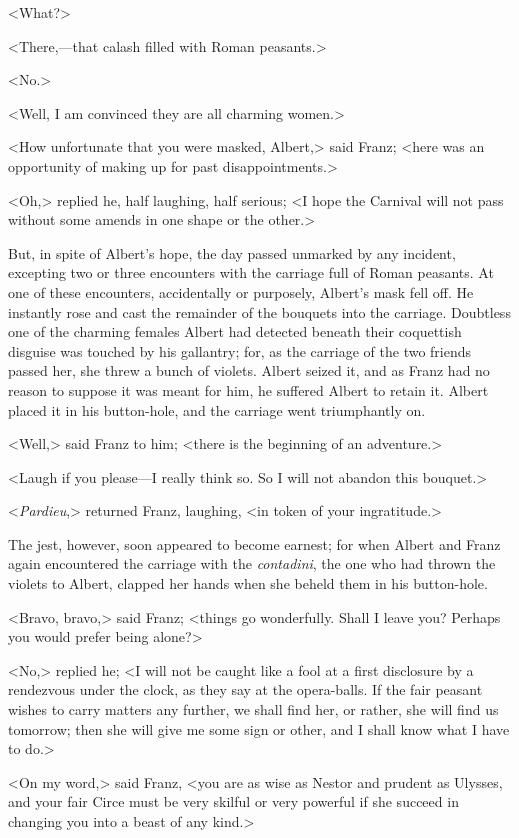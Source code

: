  <What?> 

 <There,—that calash filled with Roman peasants.> 

 <No.> 

 <Well, I am convinced they are all charming women.> 

 <How unfortunate that you were masked, Albert,> said Franz; <here was an opportunity of making up for past disappointments.> 

 <Oh,> replied he, half laughing, half serious; <I hope the Carnival will not pass without some amends in one shape or the other.> 

 But, in spite of Albert's hope, the day passed unmarked by any incident, excepting two or three encounters with the carriage full of Roman peasants. At one of these encounters, accidentally or purposely, Albert's mask fell off. He instantly rose and cast the remainder of the bouquets into the carriage. Doubtless one of the charming females Albert had detected beneath their coquettish disguise was touched by his gallantry; for, as the carriage of the two friends passed her, she threw a bunch of violets. Albert seized it, and as Franz had no reason to suppose it was meant for him, he suffered Albert to retain it. Albert placed it in his button-hole, and the carriage went triumphantly on. 

 <Well,> said Franz to him; <there is the beginning of an adventure.> 

 <Laugh if you please—I really think so. So I will not abandon this bouquet.> 

 <\textit{Pardieu},> returned Franz, laughing, <in token of your ingratitude.> 

 The jest, however, soon appeared to become earnest; for when Albert and Franz again encountered the carriage with the \textit{contadini}, the one who had thrown the violets to Albert, clapped her hands when she beheld them in his button-hole. 

 <Bravo, bravo,> said Franz; <things go wonderfully. Shall I leave you? Perhaps you would prefer being alone?> 

 <No,> replied he; <I will not be caught like a fool at a first disclosure by a rendezvous under the clock, as they say at the opera-balls. If the fair peasant wishes to carry matters any further, we shall find her, or rather, she will find us tomorrow; then she will give me some sign or other, and I shall know what I have to do.> 

 <On my word,> said Franz, <you are as wise as Nestor and prudent as Ulysses, and your fair Circe must be very skilful or very powerful if she succeed in changing you into a beast of any kind.> 

